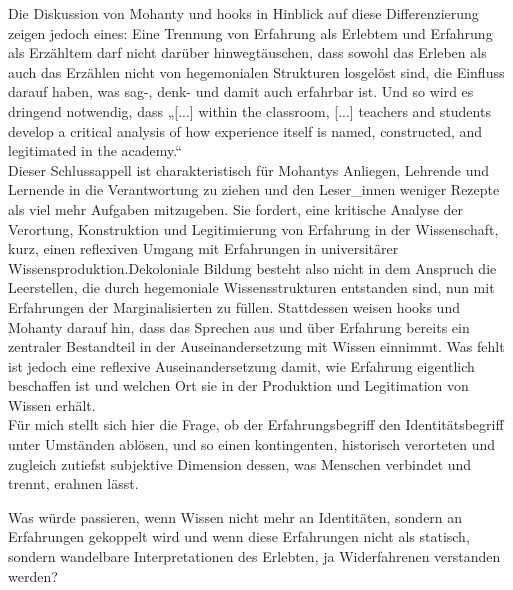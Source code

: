 Die Diskussion von Mohanty und hooks in Hinblick auf diese Differenzierung
zeigen jedoch eines: Eine Trennung von Erfahrung als Erlebtem und Erfahrung als
Erzähltem darf nicht darüber hinwegtäuschen, dass sowohl das Erleben als auch
das Erzählen nicht von hegemonialen Strukturen losgelöst sind, die Einfluss
darauf haben, was sag-,  denk- und damit auch erfahrbar ist. Und so wird es
dringend notwendig, dass „[...] within the classroom, [...] teachers and
students develop a critical analysis of how experience itself is named,
constructed, and legitimated in the academy.“\footnotemark{}
\\

Dieser Schlussappell ist charakteristisch für Mohantys Anliegen, Lehrende und
Lernende in die Verantwortung zu ziehen und den Leser\_innen weniger Rezepte
als viel mehr Aufgaben mitzugeben. Sie fordert, eine kritische Analyse der
Verortung, Konstruktion und Legitimierung von Erfahrung in der Wissenschaft,
kurz, einen reflexiven Umgang mit Erfahrungen in universitärer
Wissensproduktion.Dekoloniale Bildung besteht also nicht in dem Anspruch die Leerstellen, die
durch hegemoniale Wissensstrukturen entstanden sind, nun mit Erfahrungen der
Marginalisierten zu füllen. Stattdessen weisen hooks und Mohanty darauf hin,
dass das Sprechen aus und über Erfahrung bereits ein zentraler Bestandteil in
der Auseinandersetzung mit Wissen einnimmt. Was fehlt ist jedoch eine reflexive
Auseinandersetzung damit, wie Erfahrung eigentlich beschaffen ist und welchen
Ort sie in der Produktion und Legitimation von Wissen erhält. \\

Für mich stellt sich hier die Frage, ob der Erfahrungsbegriff den
Identitätsbegriff unter Umständen ablösen, und so einen kontingenten,
historisch verorteten und zugleich zutiefst subjektive Dimension dessen, was
Menschen verbindet und trennt, erahnen lässt.  

Was würde passieren, wenn Wissen nicht mehr an
Identitäten, sondern an Erfahrungen gekoppelt wird und wenn diese Erfahrungen
nicht als statisch, sondern wandelbare Interpretationen des Erlebten, ja
Widerfahrenen verstanden werden? 
